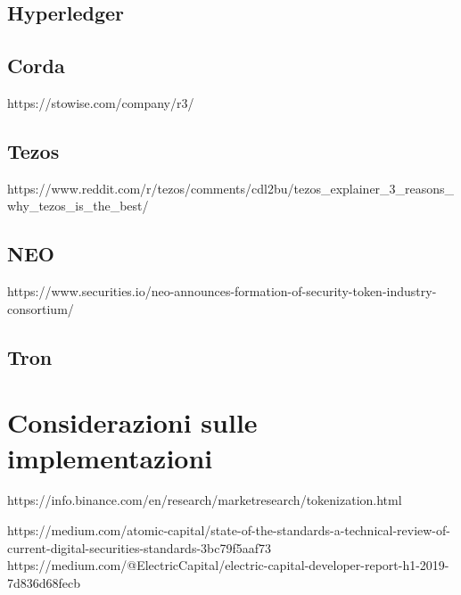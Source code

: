 \subsection{Hyperledger}
\subsection{Corda}
https://stowise.com/company/r3/
\subsection{Tezos}
https://www.reddit.com/r/tezos/comments/cdl2bu/tezos_explainer_3_reasons_why_tezos_is_the_best/
\subsection{NEO}
https://www.securities.io/neo-announces-formation-of-security-token-industry-consortium/
\subsection{Tron}
\section{Considerazioni sulle implementazioni}




https://info.binance.com/en/research/marketresearch/tokenization.html 



https://medium.com/atomic-capital/state-of-the-standards-a-technical-review-of-current-digital-securities-standards-3bc79f5aaf73
https://medium.com/@ElectricCapital/electric-capital-developer-report-h1-2019-7d836d68fecb